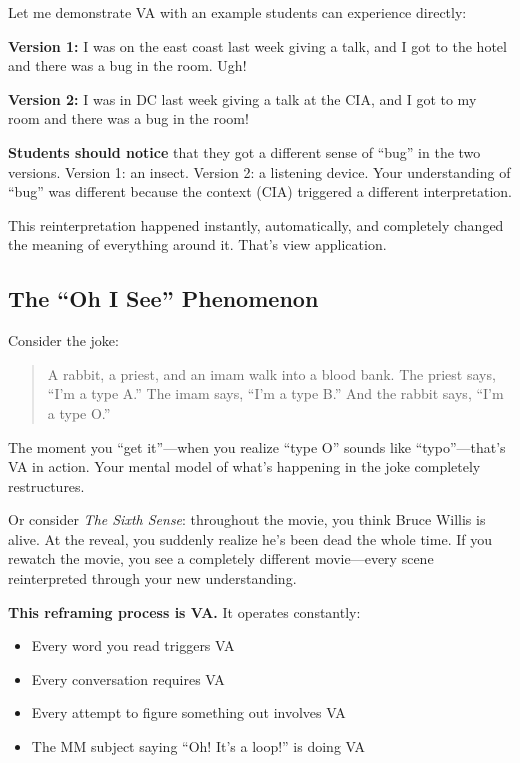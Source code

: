 \documentclass[12pt,letterpaper]{article}
\begin{document}
Let me demonstrate VA with an example students can experience directly:

\textbf{Version 1:} I was on the east coast last week giving a talk, and I got to the hotel and there was a bug in the room. Ugh!

\textbf{Version 2:} I was in DC last week giving a talk at the CIA, and I got to my room and there was a bug in the room!

\textbf{Students should notice} that they got a different sense of ``bug'' in the two versions. Version 1: an insect. Version 2: a listening device. Your understanding of ``bug'' was different because the context (CIA) triggered a different interpretation.

This reinterpretation happened instantly, automatically, and completely changed the meaning of everything around it. That's view application.

\subsection{The ``Oh I See'' Phenomenon}

Consider the joke:

\begin{quote}
A rabbit, a priest, and an imam walk into a blood bank. The priest says, ``I'm a type A.'' The imam says, ``I'm a type B.'' And the rabbit says, ``I'm a type O.''
\end{quote}

The moment you ``get it''—when you realize ``type O'' sounds like ``typo''—that's VA in action. Your mental model of what's happening in the joke completely restructures.

Or consider \textit{The Sixth Sense}: throughout the movie, you think Bruce Willis is alive. At the reveal, you suddenly realize he's been dead the whole time. If you rewatch the movie, you see a completely different movie—every scene reinterpreted through your new understanding.

\textbf{This reframing process is VA.} It operates constantly:

\begin{itemize}
\item Every word you read triggers VA
\item Every conversation requires VA
\item Every attempt to figure something out involves VA
\item The MM subject saying ``Oh! It's a loop!'' is doing VA
\end{itemize}
\end{document}

